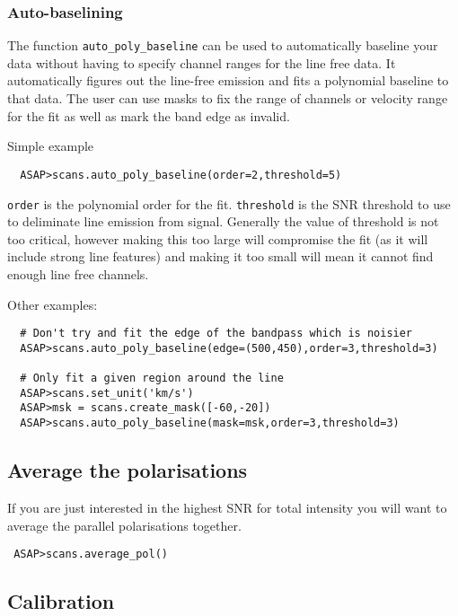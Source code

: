 \documentclass[11pt]{article}
\newcommand{\cmd}[1]{{\tt #1}}
\begin{document}
\subsubsection{Auto-baselining}

The function \cmd{auto\_poly\_baseline} can be used to automatically
baseline your data without having to specify channel ranges for the
line free data. It automatically figures out the line-free emission
and fits a polynomial baseline to that data. The user can use masks to
fix the range of channels or velocity range for the fit as well as
mark the band edge as invalid.

Simple example

\begin{verbatim}
  ASAP>scans.auto_poly_baseline(order=2,threshold=5)
\end{verbatim}

\cmd{order} is the polynomial order for the fit. \cmd{threshold} is
the SNR threshold to use to deliminate line emission from
signal. Generally the value of threshold is not too critical, however
making this too large will compromise the fit (as it will include
strong line features) and making it too small will mean it cannot find
enough line free channels.


Other examples:

\begin{verbatim}
  # Don't try and fit the edge of the bandpass which is noisier
  ASAP>scans.auto_poly_baseline(edge=(500,450),order=3,threshold=3)

  # Only fit a given region around the line
  ASAP>scans.set_unit('km/s')
  ASAP>msk = scans.create_mask([-60,-20])
  ASAP>scans.auto_poly_baseline(mask=msk,order=3,threshold=3)

\end{verbatim}

\subsection{Average the polarisations}

If you are just interested in the highest SNR for total intensity you
will want to average the parallel polarisations together.

\begin{verbatim}
 ASAP>scans.average_pol()
\end{verbatim}

\subsection{Calibration}
\end{document}
